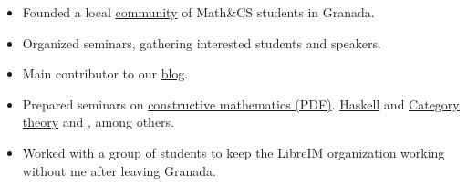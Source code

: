 \documentclass[nocolors]{friggeri-cv-a4}
\begin{document}
\begin{entrylist}
  { \vspace{-2ex}\begin{itemize}
    \item Founded a local \href{http://libreim.github.io/}{community} of Math\&CS students in Granada.
      \item Organized seminars, gathering interested students and speakers.
      \item Main contributor to our \href{http://libreim.github.io/blog/}{blog}.
      \item Prepared seminars on \href{https://github.com/mroman42/libreim-constructiva/blob/master/constructiva.pdf}{constructive mathematics (PDF)}. 
        \href{https://github.com/libreim/haskell}{Haskell} and \href{https://github.com/libreim/introCategorias/blob/master/categorias.pdf}{Category
          theory} and , among others.
      \item Worked with a group of students to keep the LibreIM organization working without me after leaving Granada.
    \end{itemize}
  }
\end{entrylist}
\end{document}
